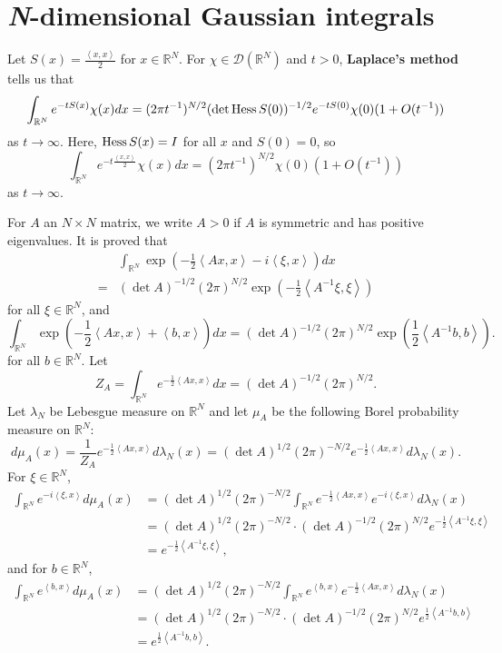 \documentclass{article}
\newcommand{\inner}[2]{\left\langle #1, #2 \right\rangle}
\newcommand{\Hess}{\ensuremath\mathrm{Hess}\,}
\theoremstyle{definition}
\theoremstyle{definition}
\begin{document}
\section{{\em N}-dimensional Gaussian integrals}
Let $S(x) = \frac{\inner{x}{x}}{2}$ for $x \in \mathbb{R}^N$. 
For $\chi \in \mathscr{D}(\mathbb{R}^N)$ and $t>0$,
\textbf{Laplace's method}
tells us that 
\[
\int_{\mathbb{R}^N} e^{-tS(x)} \chi(x) dx 
= (2\pi t^{-1})^{N/2} (\det \Hess S(0))^{-1/2} e^{-tS(0)} \chi(0) (1+O(t^{-1}))
\]
as $t \to \infty$. 
Here, $\Hess S(x) = I$ for all $x$ and $S(0)=0$, so
\[
\int_{\mathbb{R}^N} e^{-t \frac{\inner{x}{x}}{2}} \chi(x) dx = (2\pi t^{-1})^{N/2} \chi(0) (1+O(t^{-1}))
\]
as $t \to \infty$. 

For $A$ an $N \times N$ matrix, we write $A>0$ if $A$ is symmetric and has positive eigenvalues.
 It
 is proved that
\[
\begin{split}
&\int_{\mathbb{R}^N} \exp\left(-\frac{1}{2} \inner{Ax}{x} - i\inner{\xi}{x} \right) dx\\
=&(\det A)^{-1/2} (2\pi)^{N/2} \exp\left( -\frac{1}{2} \inner{A^{-1} \xi}{\xi} \right)
\end{split}
\]
for all $\xi \in \mathbb{R}^N$, and 
\[
\int_{\mathbb{R}^N} \exp\left(-\frac{1}{2}\inner{Ax}{x}+\inner{b}{x}\right) dx = (\det A)^{-1/2} (2\pi)^{N/2}
\exp\left(\frac{1}{2}\inner{A^{-1}b}{b}\right).
\]
for all $b \in \mathbb{R}^N$. 
Let
\[
Z_A = \int_{\mathbb{R}^N} e^{-\frac{1}{2}\inner{Ax}{x}} dx
=(\det A)^{-1/2} (2\pi)^{N/2}.
\]
Let $\lambda_N$ be Lebesgue measure on $\mathbb{R}^N$ and
let $\mu_A$ be the following Borel probability measure on $\mathbb{R}^N$:
\[
d\mu_A(x) = \frac{1}{Z_A} e^{-\frac{1}{2}\inner{Ax}{x}} d\lambda_N(x)
=(\det A)^{1/2} (2\pi)^{-N/2} e^{-\frac{1}{2}\inner{Ax}{x}} d\lambda_N(x).
\]
For $\xi \in \mathbb{R}^N$, 
\begin{align*}
\int_{\mathbb{R}^N} e^{-i\inner{\xi}{x}} d\mu_A(x)&=
(\det A)^{1/2} (2\pi)^{-N/2} \int_{\mathbb{R}^N} e^{-\frac{1}{2}\inner{Ax}{x}} e^{-i\inner{\xi}{x}} d\lambda_N(x)\\
&=(\det A)^{1/2} (2\pi)^{-N/2}  \cdot (\det A)^{-1/2} (2\pi)^{N/2} e^{-\frac{1}{2}\inner{A^{-1}\xi}{\xi}}\\
&=e^{-\frac{1}{2}\inner{A^{-1}\xi}{\xi}},
\end{align*}
and for $b \in \mathbb{R}^N$,
\begin{align*}
\int_{\mathbb{R}^N} e^{\inner{b}{x}} d\mu_A(x)&=
(\det A)^{1/2} (2\pi)^{-N/2}  \int_{\mathbb{R}^N} e^{\inner{b}{x}}
e^{-\frac{1}{2}\inner{Ax}{x}} d\lambda_N(x)\\
&=(\det A)^{1/2} (2\pi)^{-N/2}   \cdot
(\det A)^{-1/2} (2\pi)^{N/2}
e^{\frac{1}{2}\inner{A^{-1}b}{b}}\\
&=e^{\frac{1}{2}\inner{A^{-1}b}{b}}.
\end{align*}
\end{document}
